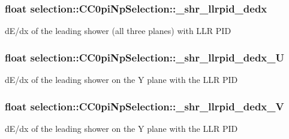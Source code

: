 \subsubsection[{\texorpdfstring{\+\_\+shr\+\_\+llrpid\+\_\+dedx}{_shr_llrpid_dedx}}]{\setlength{\rightskip}{0pt plus 5cm}float selection\+::\+C\+C0pi\+Np\+Selection\+::\+\_\+shr\+\_\+llrpid\+\_\+dedx\hspace{0.3cm}{\ttfamily [private]}}\hypertarget{classselection_1_1CC0piNpSelection_a69fe01c749c1be00582e7c1cf27ced22}{}\label{classselection_1_1CC0piNpSelection_a69fe01c749c1be00582e7c1cf27ced22}
d\+E/dx of the leading shower (all three planes) with L\+LR P\+ID 
\subsubsection[{\texorpdfstring{\+\_\+shr\+\_\+llrpid\+\_\+dedx\+\_\+U}{_shr_llrpid_dedx_U}}]{\setlength{\rightskip}{0pt plus 5cm}float selection\+::\+C\+C0pi\+Np\+Selection\+::\+\_\+shr\+\_\+llrpid\+\_\+dedx\+\_\+U\hspace{0.3cm}{\ttfamily [private]}}\hypertarget{classselection_1_1CC0piNpSelection_a30e6e7359995cc9ddb52db719cd4064e}{}\label{classselection_1_1CC0piNpSelection_a30e6e7359995cc9ddb52db719cd4064e}
d\+E/dx of the leading shower on the Y plane with the L\+LR P\+ID 
\subsubsection[{\texorpdfstring{\+\_\+shr\+\_\+llrpid\+\_\+dedx\+\_\+V}{_shr_llrpid_dedx_V}}]{\setlength{\rightskip}{0pt plus 5cm}float selection\+::\+C\+C0pi\+Np\+Selection\+::\+\_\+shr\+\_\+llrpid\+\_\+dedx\+\_\+V\hspace{0.3cm}{\ttfamily [private]}}\hypertarget{classselection_1_1CC0piNpSelection_af27b6e10cdab2cb2b5c07bfcf7a8e491}{}\label{classselection_1_1CC0piNpSelection_af27b6e10cdab2cb2b5c07bfcf7a8e491}
d\+E/dx of the leading shower on the Y plane with the L\+LR P\+ID 

